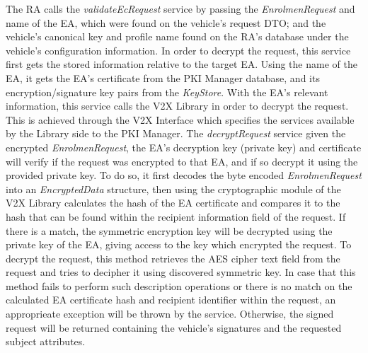The RA calls the \textit{validateEcRequest} service by passing the \textit{EnrolmenRequest} and name of the EA, which were found on the vehicle's request DTO; and the vehicle's canonical key and profile name found on the RA's database under the vehicle's configuration information. In order to decrypt the request, this service first gets the stored information relative to the target EA. Using the name of the EA, it gets the EA's certificate from the PKI Manager database, and its encryption/signature key pairs from the \textit{KeyStore}. With the EA's relevant information, this service calls the V2X Library in order to decrypt the request. This is achieved through the V2X Interface which specifies the services available by the Library side to the PKI Manager. The \textit{decryptRequest} service given the encrypted \textit{EnrolmenRequest}, the EA's decryption key (private key) and certificate will verify if the request was encrypted to that EA, and if so decrypt it using the provided private key. To do so, it first decodes the byte encoded \textit{EnrolmenRequest} into an \textit{EncryptedData} structure, then using the cryptographic module of the V2X Library calculates the hash of the EA certificate and compares it to the hash that can be found within the recipient information field of the request. If there is a match, the symmetric encryption key will be decrypted using the private key of the EA, giving access to the key which encrypted the request. To decrypt the request, this method retrieves the AES cipher text field from the request and tries to decipher it using discovered symmetric key. In case that this method fails to perform such description operations or there is no match on the calculated EA certificate hash and recipient identifier within the request, an approprieate exception will be thrown by the service. Otherwise, the signed request will be returned containing the vehicle's signatures and the requested subject attributes.

